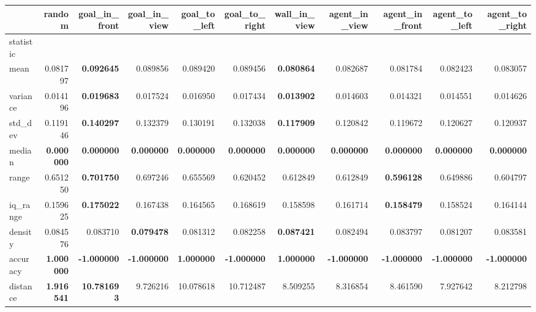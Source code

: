 \begin{tabular}{lrrrrrrrrrr}
\toprule
 & random & goal\_in\_front & goal\_in\_view & goal\_to\_left & goal\_to\_right & wall\_in\_view & agent\_in\_view & agent\_in\_front & agent\_to\_left & agent\_to\_right \\
\midrule
statistic &  &  &  &  &  &  &  &  &  &  \\
mean & 0.081797 & \color{f_green} \bfseries 0.092645 & 0.089856 & 0.089420 & 0.089456 & \color{f_darkred} \bfseries 0.080864 & 0.082687 & 0.081784 & 0.082423 & 0.083057 \\
variance & 0.014196 & \color{f_green} \bfseries 0.019683 & 0.017524 & 0.016950 & 0.017434 & \color{f_darkred} \bfseries 0.013902 & 0.014603 & 0.014321 & 0.014551 & 0.014626 \\
std\_dev & 0.119146 & \color{f_green} \bfseries 0.140297 & 0.132379 & 0.130191 & 0.132038 & \color{f_darkred} \bfseries 0.117909 & 0.120842 & 0.119672 & 0.120627 & 0.120937 \\
median & \color{f_green} \bfseries \color{f_darkred} \bfseries 0.000000 & \color{f_green} \bfseries \color{f_darkred} \bfseries 0.000000 & \color{f_green} \bfseries \color{f_darkred} \bfseries 0.000000 & \color{f_green} \bfseries \color{f_darkred} \bfseries 0.000000 & \color{f_green} \bfseries \color{f_darkred} \bfseries 0.000000 & \color{f_green} \bfseries \color{f_darkred} \bfseries 0.000000 & \color{f_green} \bfseries \color{f_darkred} \bfseries 0.000000 & \color{f_green} \bfseries \color{f_darkred} \bfseries 0.000000 & \color{f_green} \bfseries \color{f_darkred} \bfseries 0.000000 & \color{f_green} \bfseries \color{f_darkred} \bfseries 0.000000 \\
range & 0.651250 & \color{f_green} \bfseries 0.701750 & 0.697246 & 0.655569 & 0.620452 & 0.612849 & 0.612849 & \color{f_darkred} \bfseries 0.596128 & 0.649886 & 0.604797 \\
iq\_range & 0.159625 & \color{f_green} \bfseries 0.175022 & 0.167438 & 0.164565 & 0.168619 & 0.158598 & 0.161714 & \color{f_darkred} \bfseries 0.158479 & 0.158524 & 0.164144 \\
density & 0.084576 & 0.083710 & \color{f_darkred} \bfseries 0.079478 & 0.081312 & 0.082258 & \color{f_green} \bfseries 0.087421 & 0.082494 & 0.083797 & 0.081207 & 0.083581 \\
accuracy & \color{f_green} \bfseries 1.000000 & \color{f_darkred} \bfseries -1.000000 & \color{f_darkred} \bfseries -1.000000 & \color{f_green} \bfseries 1.000000 & \color{f_darkred} \bfseries -1.000000 & \color{f_green} \bfseries 1.000000 & \color{f_darkred} \bfseries -1.000000 & \color{f_darkred} \bfseries -1.000000 & \color{f_darkred} \bfseries -1.000000 & \color{f_darkred} \bfseries -1.000000 \\
distance & \color{f_darkred} \bfseries 1.916541 & \color{f_green} \bfseries 10.781693 & 9.726216 & 10.078618 & 10.712487 & 8.509255 & 8.316854 & 8.461590 & 7.927642 & 8.212798 \\
\bottomrule
\end{tabular}